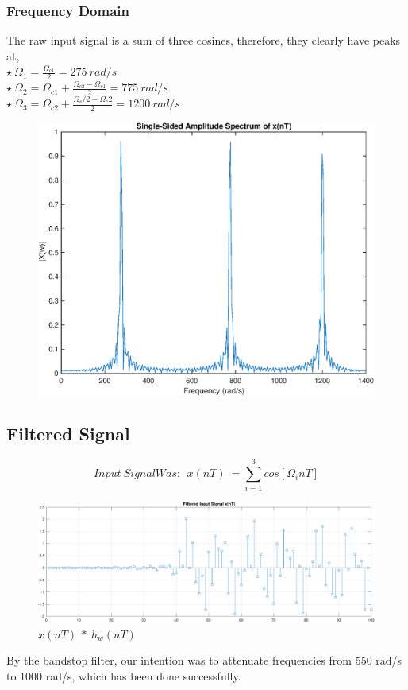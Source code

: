 \documentclass[11pt]{article}
\begin{document}
\subsubsection{Frequency Domain}
The raw input signal is a sum of three cosines, therefore, they clearly have peaks at,\\
$\star \ \Omega_1 = \frac{\Omega_{c1}}{2} = 275 \ rad/s$\\
$\star \ \Omega_2 =\Omega_{c1} + \frac{\Omega_{c2}-\Omega_{c1}}{2}=775\ rad/s$\\
$\star \ \Omega_3 = \Omega_{c2} + \frac{\Omega_s/2-\Omega_c2}{2}=1200\ rad/s$
\begin{figure}[H]
    \centering
    \includegraphics[scale=0.7]{Xw.eps} 
\end{figure}

\subsection{Filtered Signal}

$$Input\ Signal Was: \ \ x( nT) \ =\sum ^{3}_{i=1} cos[ \Omega _{i} nT]$$
\begin{figure}[H]
    \centering
    \includegraphics[scale=0.6]{filtered} 
    \caption{$x( nT) \ *\ h_{w}( nT)$}
    \label{fig:filtered-signal}
\end{figure}
By the bandstop filter, our intention was to attenuate frequencies from 550 rad/s to 1000 rad/s, which has been done successfully. 
\end{document}
